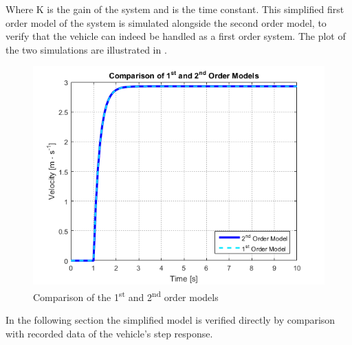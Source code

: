 %
Where \si{K} is the gain of the system and \si{\tau} is the time constant. This simplified first order model of the system is simulated alongside the second order model, to verify that the vehicle can indeed be handled as a first order system. The plot of the two simulations are illustrated in .
%
\begin{figure}[H]
	\centering
	\includegraphics[width = .8\textwidth]{figures/ComparisonOf1stAnd2ndOrderModels.png}
	\caption{Comparison of the \si{1^{st}} and \si{2^{nd}} order models}
	\label{fig:ComparisonOf1stAnd2ndOrderModels}
\end{figure}
%
In the following section the simplified model is verified directly by comparison with recorded data of the vehicle's step response.